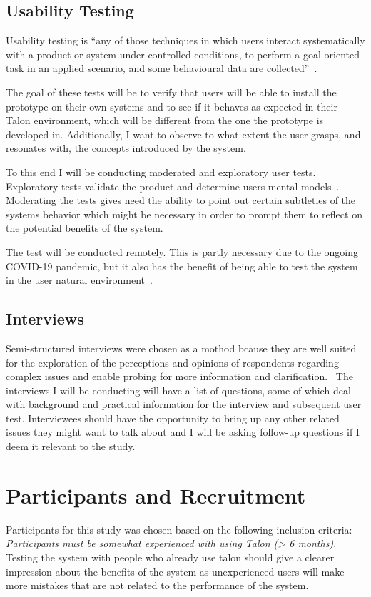 \documentclass[../thesis.tex]{subfiles}
\begin{document}
\subsection{Usability Testing}
Usability testing is ``any of those
techniques in which users interact systematically with a product or system under
controlled conditions, to perform a goal-oriented task in an applied scenario, and
some behavioural data are collected''~\parencite{wichansky2000usability}.

The goal of these tests will be to verify that users will be able to install the prototype
on their own systems and to see if it behaves as expected in their Talon environment, which will be different from
the one the prototype is developed in.
Additionally, I want to observe to what extent the user grasps, and resonates with, the concepts introduced by the system.

To this end I will be conducting moderated and exploratory user tests.
Exploratory tests validate the product and determine users mental models~\parencite{vasalou2004human}.
Moderating the tests gives need the ability to point out certain subtleties of the systems behavior
which might be necessary in order to prompt them to reflect on the potential benefits of the system.

The test will be conducted remotely.
This is partly necessary due to the ongoing COVID-19 pandemic, but it also has the
benefit of being able to test the system in the user natural environment~\parencite{vasalou2004human}.

\subsection{Interviews}
Semi-structured interviews were chosen as a mothod bcause they are  well  suited  for  the  exploration  of  the perceptions and opinions of  respondents regarding complex issues and enable probing for more information and clarification.~\parencite{louise1994collecting}
The interviews I will be conducting will have a list of questions, some of which deal with background and practical information for the interview and subsequent user test.
Interviewees should have the opportunity to bring up any other related issues they might want to talk about and I will be asking follow-up questions
if I deem it relevant to the study.

\section{Participants and Recruitment}
Participants for this study was chosen based on the following inclusion criteria:
\textit{Participants must be somewhat experienced with using Talon (> 6 months)}.
Testing the system with people who already use talon should give a clearer impression
about the benefits of the system as unexperienced users will make more mistakes that are not 
related to the performance of the system.
\end{document}
